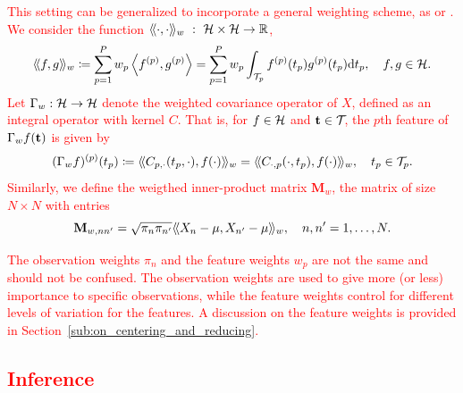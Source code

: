 \textcolor{red}{This setting can be generalized to incorporate a general weighting scheme, as \cite{chiouMultivariateFunctionalPrincipal2014} or \cite{happMultivariateFunctionalPrincipal2018a}. We consider the function $\langle\!\langle\cdot, \cdot\rangle\!\rangle_w~:~\mathcal{H} \times \mathcal{H} \rightarrow \mathbb{R}$,
\begin{equation}\label{eq:innerprodH_weight}
    \langle\!\langle f, g\rangle\!\rangle_w \coloneqq \sum_{p=1}^{P} w_p\left\langle f^{(p)}, g^{(p)}\right\rangle = \sum_{p=1}^{P}w_p\int_{\mathcal{T}_{p}} f^{(p)}(t_p)g^{(p)}(t_p) {\rm d} t_p, \quad f, g \in \mathcal{H}.
\end{equation}
Let $\Gamma_w : \mathcal{H} \rightarrow \mathcal{H}$ denote the weighted covariance operator of $X$, defined as an integral operator with kernel $C$. That is, for $f \in \mathcal{H}$ and $\mathbf{t} \in \mathcal{T}_{}$, the $p$th feature of $\Gamma_w f(\mathbf{t})$ is given by
\begin{equation}\label{eq:covariance_operator_components_weight}
    (\Gamma_w f)^{(p)}(t_p) \coloneqq \langle\!\langle C_{p, \cdot}(t_p, \cdot), f(\cdot)\rangle\!\rangle_w = \langle\!\langle C_{\cdot, p}(\cdot, t_p), f(\cdot)\rangle\!\rangle_w, \quad t_p \in \mathcal{T}_{p}.
\end{equation}
Similarly, we define the weigthed inner-product matrix $\mathbf{M}_w$, the matrix of size $N \times N$ with entries
\begin{equation}\label{eq:gram_mat_weights}
    \mathbf{M}_{w, nn^\prime} = \sqrt{\pi_n \pi_{n^{\prime}}}\langle\!\langle X_n - \mu, X_{n^\prime} - \mu\rangle\!\rangle_w, \quad n, n^\prime = 1, \dots, N.
\end{equation}
\begin{remark}
The observation weights $\pi_n$ and the feature weights $w_p$ are not the same and should not be confused. The observation weights are used to give more (or less) importance to specific observations, while the feature weights control for different levels of variation for the features. A discussion on the feature weights is provided in Section~\ref{sub:on_centering_and_reducing}.    
\end{remark}
}

\subsection{\textcolor{red}{Inference}} %
\label{sub:inference}

